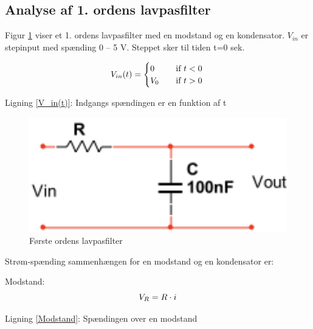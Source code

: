 \subsection{Analyse af 1. ordens lavpasfilter}
Figur \ref{lavpasfilter} viser et 1. ordens lavpasfilter med en modstand og en kondensator. $V_{in}$ er stepinput med spænding 0 – 5 V. Steppet sker til tiden t=0 sek.


\begin{equation}
 V_{in}(t) =
  \begin{cases}
    0 & \quad \text{if } t <0\\
    V_{0}&\quad \text{if } t >0\\
  \end{cases}
\label{V_in(t)}\\
\end{equation}
\begin{center}
Ligning \ref{V_in(t)}: Indgangs spændingen er en funktion af t
\end{center}


\begin{figure}[h]
\begin{center}
\includegraphics[height=5cm]{M_Fig/Ana_1_Ordens_Lavpasfilter}
\caption{Første ordens lavpasfilter}
\label{lavpasfilter}
\end{center}
\end{figure}

Strøm-spænding sammenhængen for en modstand og en kondensator er:


Modstand:
\begin{equation}
 V_{R} =R\cdot i
\label{Modstand}\\
\end{equation}
\begin{center}
Ligning \ref{Modstand}: Spændingen over en modstand
\end{center}

